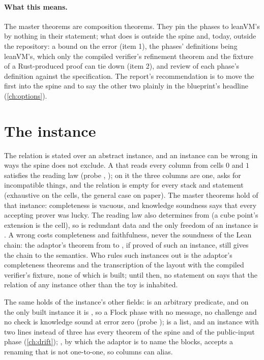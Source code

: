 \paragraph{What this means.} The master theorems are composition theorems. They pin the
phases to leanVM's by nothing in their statement; what does is outside the spine and, today,
outside the repository: a bound on the error (item 1), the phases' definitions being leanVM's,
which only the compiled verifier's refinement theorem and the fixture of a Rust-produced proof
can tie down (item 2), and review of each phase's definition against the specification. The
report's recommendation is to move the first into the spine and to say the other two plainly
in the blueprint's headline (\cref{ch:options}).

\section{The instance}\label{sec:nv-instance}

The relation is stated over an abstract instance, and an instance can be wrong in ways the
spine does not exclude. A  that reads every column from cells $0$ and $1$
satisfies the reading law (probe , ); on it the three columns
are one,  asks for incompatible things, and the relation is empty for every stack
and statement (exhaustive on the cells, the general case on paper). The master theorems hold of
that instance: completeness is vacuous, and knowledge soundness says that every accepting
prover was lucky. The reading law also determines  from  (a cube point's
extension is the cell), so  is redundant data and the only freedom of an instance is
. A wrong  costs completeness and faithfulness, never the soundness of
the Lean chain: the adaptor's theorem from  to , if proved of
such an instance, still gives the chain to the semantics. Who rules such instances out is the
adaptor's completeness theorems and the transcription of the layout with the compiled verifier's
fixture, none of which is built; until then, no statement on  says that the relation
of any instance other than the toy is inhabited.

The same holds of the instance's other fields:  is an arbitrary predicate, and on the
only built instance it is , so a Flock phase with no message, no challenge and no
check is knowledge sound at error zero (probe );  is a
list, and an instance with two lines instead of three has every theorem of the spine and of the
public-input phase (\cref{ch:drift}); , by which the adaptor is to name the
blocks, accepts a renaming that is not one-to-one, so columns can alias.


